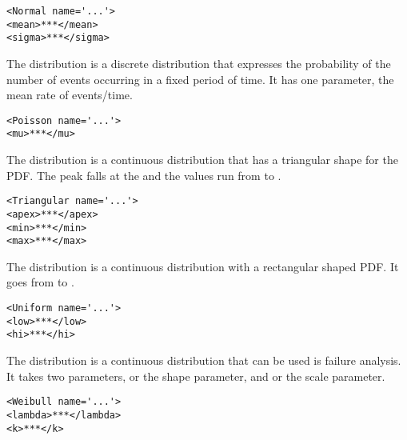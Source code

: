 \begin{lstlisting}[style=XML]
<Normal name='...'>
<mean>***</mean>
<sigma>***</sigma>
\end{lstlisting}



The  distribution is a discrete distribution that
expresses the probability of the number of events occurring in a fixed
period of time.  It has one parameter,  the mean rate
of events/time.

\begin{lstlisting}[style=XML]
<Poisson name='...'>
<mu>***</mu>
\end{lstlisting}


The  distribution is a continuous distribution
that has a triangular shape for the PDF.  The peak falls at the
 and the values run from  to
.

\begin{lstlisting}[style=XML]
<Triangular name='...'>
<apex>***</apex>
<min>***</min>
<max>***</max>
\end{lstlisting}



The  distribution is a continuous distribution with
a rectangular shaped PDF.  It goes from  to
.

\begin{lstlisting}[style=XML]
<Uniform name='...'>
<low>***</low>
<hi>***</hi>
\end{lstlisting}


The  distribution is a continuous distribution that
can be used is failure analysis.  It takes two parameters,
 or the shape parameter, and  or the
scale parameter.

\begin{lstlisting}[style=XML]
<Weibull name='...'>
<lambda>***</lambda>
<k>***</k>
\end{lstlisting}






